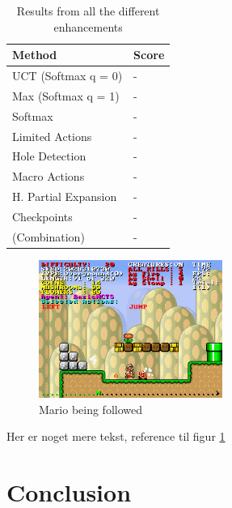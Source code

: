 \documentclass[10pt,a4paper]{article}
\begin{document}
\begin{table}[h]
	\centering
	\begin{tabular}{| l | l |}
		\hline
		\textbf{Method} & \textbf{Score} \\ \hline
		UCT (Softmax q = 0)				& - \\ \hline
		Max (Softmax q = 1)				& - \\ \hline
		Softmax							& - \\ \hline
		Limited Actions		 			& - \\ \hline
		Hole Detection		 			& - \\ \hline
		Macro Actions		 			& - \\ \hline
		H. Partial Expansion			& - \\ \hline
		Checkpoints						& - \\ \hline
		(Combination)					& - \\ \hline
	\end{tabular}
	\caption{Results from all the different enhancements}
	\label{tab:method_results}
\end{table}


\begin{figure}[h]
\centering
\includegraphics[width=6cm]{Forfulgt.png}
\caption{Mario being followed}
\label{fig:followed}
\end{figure}

Her er noget mere tekst, reference til figur \ref{fig:followed}
\clearpage
\section{Conclusion}
\clearpage
\end{document}

